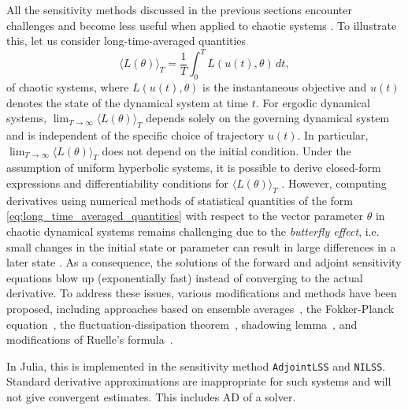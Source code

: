 All the sensitivity methods discussed in the previous sections encounter challenges and become less useful when applied to chaotic systems \cite{Wang2012-chaos-adjoint}.
To illustrate this, let us consider long-time-averaged quantities 
\begin{equation}\label{eq:long_time_averaged_quantities}
    \langle L(\theta) \rangle_T = \frac{1}{T} \int_0^T L(u(t), \theta) \, dt, 
\end{equation}
of chaotic systems, where $L(u(t), \theta)$ is the instantaneous objective and $u(t)$ denotes the state of the dynamical system at time $t$.
For ergodic dynamical systems, $\lim_{T\to\infty} \langle L(\theta) \rangle_T$ depends solely on the governing dynamical system and is independent of the specific choice of trajectory $u(t)$. 
In particular, $\lim_{T\to\infty} \langle L(\theta) \rangle_T$ does not depend on the initial condition. 
Under the assumption of uniform hyperbolic systems, it is possible to derive closed-form expressions and differentiability conditions for $ \langle L(\theta) \rangle_T$ \cite{ruelle1997differentiation,ruelle2009review}.
However, computing derivatives using numerical methods of statistical quantities of the form \eqref{eq:long_time_averaged_quantities} with respect to the vector parameter $\theta$ in chaotic dynamical systems remains challenging due to the \textit{butterfly effect}, i.e. small changes in the initial state or parameter can result in large differences in a later state \cite{Lorenz.1963}.
As a consequence, the solutions of the forward and adjoint sensitivity equations blow up (exponentially fast) instead of converging to the actual derivative.
To address these issues, various modifications and methods have been proposed, including approaches based on ensemble averages~\cite{lea2000sensitivity, eyink2004ruelle}, the Fokker-Planck equation~\cite{thuburn2005climate, blonigan2014probability}, the fluctuation-dissipation theorem~\cite{leith1975climate, abramov2007blended, abramov2008new}, shadowing lemma~\cite{wang2013forward, wang2014least, wang2014convergence, ni2017sensitivity, blonigan2017adjoint, blonigan2018multiple, ni2019adjoint, ni2019sensitivity}, and modifications of Ruelle's formula~\cite{chandramoorthy2022efficient, ni2020fast}.

In Julia, this is implemented in the sensitivity method \texttt{AdjointLSS} and \texttt{NILSS}. 
Standard derivative approximations are inappropriate for such systems and will not give convergent estimates.
This includes AD of a solver.
